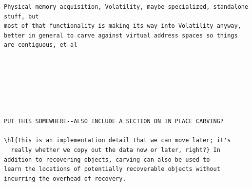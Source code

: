 \begin{Verbatim}
Physical memory acquisition, Volatility, maybe specialized, standalone stuff, but
most of that functionality is making its way into Volatility anyway, better in general to carve against virtual address spaces so things are contiguous, et al







PUT THIS SOMEWHERE--ALSO INCLUDE A SECTION ON IN PLACE CARVING? 

\hl{This is an implementation detail that we can move later; it's
  really whether we copy out the data now or later, right?} In addition to recovering objects, carving can also be used to 
learn the locations of potentially recoverable objects without
incurring the overhead of recovery. 





\end{Verbatim}
